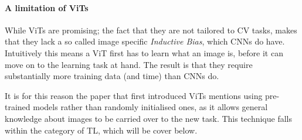 






\paragraph{A limitation of ViTs}
While ViTs are promising; the fact that they are not tailored to CV tasks, makes that they lack a so called image specific \textit{Inductive Bias}, which CNNs do have. Intuitively this means a ViT first has to learn what an image is, before it can move on to the learning task at hand. The result is that they require substantially more training data (and time) than CNNs do. 

It is for this reason the paper that first introduced ViTs \citep{dosovitskiy2020image} mentions using pre-trained models rather than randomly initialised ones, as it allows general knowledge about images to be carried over to the new task. This technique falls within the category of TL, which will be cover below. 

